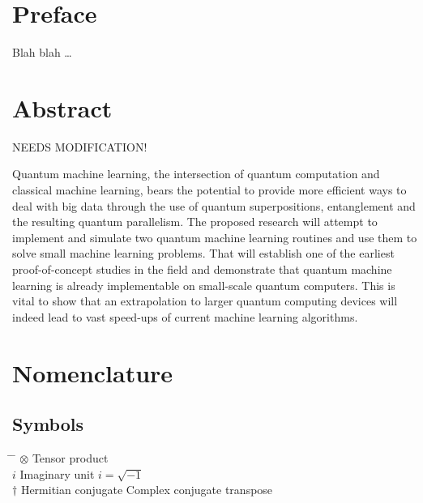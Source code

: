 
\chapter*{Preface}

Blah blah \dots

 \cleardoublepage


 \setcounter{tocdepth}{2}
 \tableofcontents

 \cleardoublepage


\chapter*{Abstract}

NEEDS MODIFICATION!

Quantum machine learning, the intersection of quantum computation and classical machine learning,
bears the potential to provide more efficient ways to deal with big data through the use of quantum
superpositions, entanglement and the resulting quantum parallelism. The proposed research will
attempt to implement and simulate two quantum machine learning routines and use them to solve
small machine learning problems. That will establish one of the earliest proof-of-concept studies in
the field and demonstrate that quantum machine learning is already implementable on small-scale
quantum computers. This is vital to show that an extrapolation to larger quantum computing devices
will indeed lead to vast speed-ups of current machine learning algorithms.

 \cleardoublepage


\chapter*{Nomenclature}\label{chap:symbole}

\section*{Symbols}
\begin{tabbing}
 \hspace*{1.6cm} \= \hspace*{8cm} \= \kill
 $\otimes$ \> Tensor product \\[0.5ex]
 $i$ \> Imaginary unit \> $i=\sqrt{-1}$ \\[0.5ex]
 $\dagger$ \> Hermitian conjugate \> Complex conjugate transpose \\[0.5ex]
\end{tabbing}

